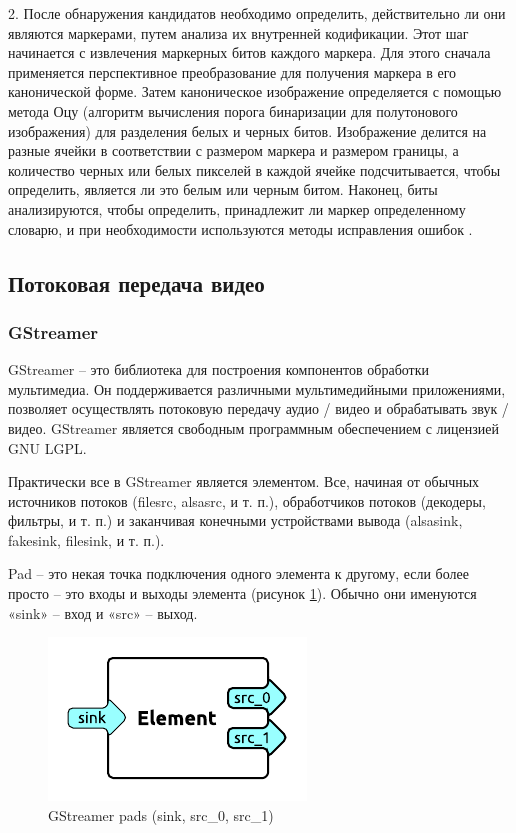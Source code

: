 2. После обнаружения кандидатов необходимо определить, действительно ли они являются маркерами, путем анализа их внутренней кодификации. Этот шаг начинается с извлечения маркерных битов каждого маркера. Для этого сначала применяется перспективное преобразование для получения маркера в его канонической форме. Затем каноническое изображение определяется с помощью метода Оцу (алгоритм вычисления порога бинаризации для полутонового изображения) для разделения белых и черных битов. Изображение делится на разные ячейки в соответствии с размером маркера и размером границы, а количество черных или белых пикселей в каждой ячейке подсчитывается, чтобы определить, является ли это белым или черным битом. Наконец, биты анализируются, чтобы определить, принадлежит ли маркер определенному словарю, и при необходимости используются методы исправления ошибок \cite{opencv}.

\subsection{Потоковая передача видео}
\subsubsection{GStreamer}

GStreamer -- это библиотека для построения компонентов обработки мультимедиа. 
Он поддерживается различными мультимедийными приложениями, позволяет осуществлять потоковую передачу аудио / видео и обрабатывать звук / видео. GStreamer является свободным программным обеспечением с лицензией GNU LGPL.

Практически все в GStreamer является элементом. Все, начиная от обычных источников потоков (filesrc, alsasrc, и т. п.), обработчиков потоков (декодеры, фильтры, и т. п.) и заканчивая конечными устройствами вывода (alsasink, fakesink, filesink, и т. п.).

Pad -- это некая точка подключения одного элемента к другому, если более просто -- это входы и выходы элемента (рисунок \ref{fig:ris12}). Обычно они именуются «sink» -- вход и «src» -- выход.
\begin{figure}[H]
	\centering
	\includegraphics[width=0.5\linewidth]{pics/pic1}
	\caption{ GStreamer pads (sink, src\_0, src\_1)
	}
	\label{fig:ris12}
\end{figure}


